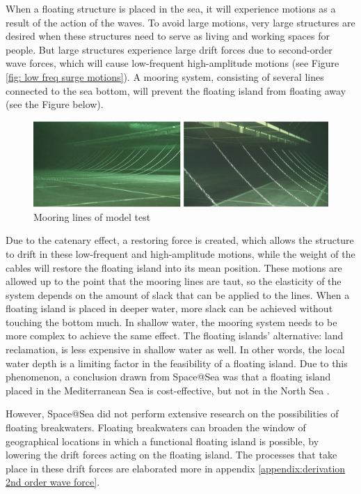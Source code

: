 When a floating structure is placed in the sea, it will experience motions as a result of the action of the waves. To avoid large motions, very large structures are desired when these structures need to serve as living and working spaces for people. But large structures experience large drift forces due to second-order wave forces, which will cause low-frequent high-amplitude motions (see Figure \ref{fig: low freq surge motions}). A mooring system, consisting of several lines connected to the sea bottom, will prevent the floating island from floating away (see the Figure below). 
\begin{figure}[H]
    \centering
    \includegraphics[width=\linewidth]{figures/Literature_Introduction/mooringlines.PNG}
    \caption{Mooring lines of model test \citep{S@S_demonstationatwavetank}}
    \label{fig:mooringlines}
\end{figure}

Due to the catenary effect, a restoring force is created, which allows the structure to drift in these low-frequent and high-amplitude motions, while the weight of the cables will restore the floating island into its mean position. These motions are allowed up to the point that the mooring lines are taut, so the elasticity of the system depends on the amount of slack that can be applied to the lines. When a floating island is placed in deeper water, more slack can be achieved without touching the bottom much. In shallow water, the mooring system needs to be more complex to achieve the same effect. The floating islands' alternative: land reclamation, is less expensive in shallow water as well. In other words, the local water depth is a limiting factor in the feasibility of a floating island. Due to this phenomenon, a conclusion drawn from Space@Sea was that a floating island placed in the Mediterranean Sea is cost-effective, but not in the North Sea \citep{businessCase_S@S_D1.1}. 



However, Space@Sea did not perform extensive research on the possibilities of floating breakwaters. Floating breakwaters can broaden the window of geographical locations in which a functional floating island is possible, by lowering the drift forces acting on the floating island. The processes that take place in these drift forces are elaborated more in appendix \ref{appendix:derivation 2nd order wave force}.\\
\\
 
